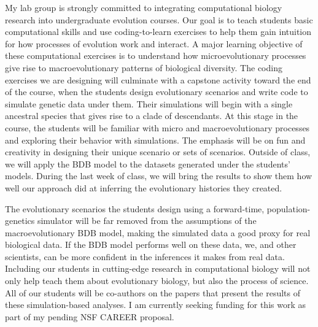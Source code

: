 My lab group is strongly committed to integrating computational biology
research into undergraduate evolution courses.
Our goal is to teach students basic computational skills and use
coding-to-learn exercises to help them gain intuition for how processes of
evolution work and interact.
A major learning objective of these computational exercises is to understand
how microevolutionary processes give rise to macroevolutionary patterns of
biological diversity.
The coding exercises we are designing will culminate with a capstone activity
toward the end of the course, when the students design evolutionary scenarios
and write code to simulate genetic data under them.
Their
simulations will begin with a single ancestral species
that gives rise to a clade of descendants.
At this stage in the course, the students will be familiar with
micro and macroevolutionary processes and exploring their behavior
with simulations.
The emphasis will be on fun and creativity in designing their unique scenario
or sets of scenarios.
Outside of class, we will apply the BDB model
to the datasets generated under the students' models.
During the last week of class, we will bring the results to show them how well
our approach did at inferring the evolutionary histories they created.

The evolutionary scenarios the students design
using a forward-time, population-genetics simulator
will be far removed from the assumptions
of the macroevolutionary BDB model,
making the simulated data a good proxy for real biological data.
If the BDB model performs well on these data, we, and other scientists, can be
more confident in the inferences it makes from real data.
Including our students in
cutting-edge research in computational biology will not only help
teach them about evolutionary biology, but also the process of science.
All of our students will be co-authors on the papers that present the results
of these simulation-based analyses.
I am currently seeking funding for this work as part of my pending NSF CAREER
proposal.



